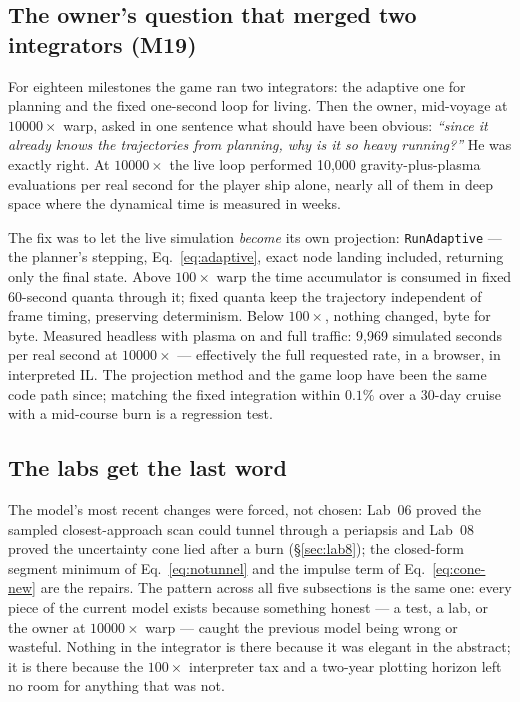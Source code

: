 \documentclass[10pt,twocolumn]{article}
\begin{document}
\subsection{The owner's question that merged two integrators (M19)}

For eighteen milestones the game ran two integrators: the adaptive one for planning and
the fixed one-second loop for living. Then the owner, mid-voyage at $10000\times$ warp,
asked in one sentence what should have been obvious: \emph{``since it already knows the
trajectories from planning, why is it so heavy running?''} He was exactly right. At
$10000\times$ the live loop performed 10{,}000 gravity-plus-plasma evaluations per real
second for the player ship alone, nearly all of them in deep space where the dynamical
time is measured in weeks.

The fix was to let the live simulation \emph{become} its own projection:
\texttt{RunAdaptive} --- the planner's stepping, Eq.~\eqref{eq:adaptive}, exact node
landing included, returning only the final state. Above $100\times$ warp the time
accumulator is consumed in fixed 60-second quanta through it; fixed quanta keep the
trajectory independent of frame timing, preserving determinism. Below $100\times$,
nothing changed, byte for byte. Measured headless with plasma on and full traffic:
9{,}969 simulated seconds per real second at $10000\times$ --- effectively the full
requested rate, in a browser, in interpreted IL. The projection method and the game loop
have been the same code path since; matching the fixed integration within $0.1\%$ over a
30-day cruise with a mid-course burn is a regression test.

\subsection{The labs get the last word}

The model's most recent changes were forced, not chosen: Lab~06 proved the sampled
closest-approach scan could tunnel through a periapsis and Lab~08 proved the uncertainty
cone lied after a burn (\S\ref{sec:lab8}); the closed-form segment minimum of
Eq.~\eqref{eq:notunnel} and the impulse term of Eq.~\eqref{eq:cone-new} are the repairs.
The pattern across all five subsections is the same one: every piece of the current model
exists because something honest --- a test, a lab, or the owner at $10000\times$ warp ---
caught the previous model being wrong or wasteful. Nothing in the integrator is there
because it was elegant in the abstract; it is there because the $100\times$ interpreter
tax and a two-year plotting horizon left no room for anything that was not.
\end{document}
